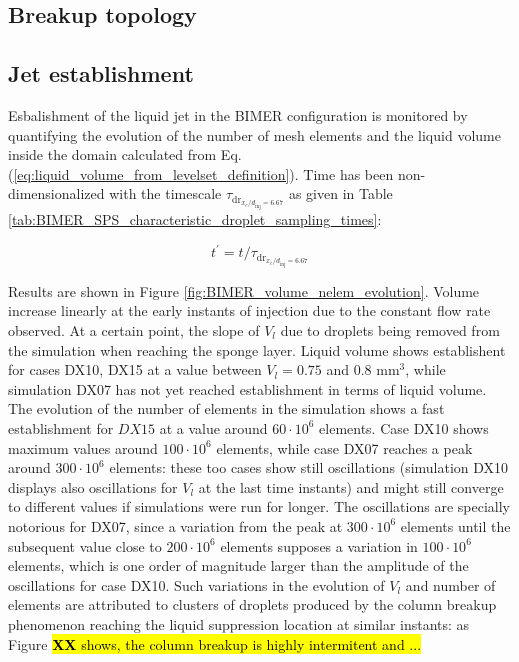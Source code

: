 \clearpage

\subsection{Breakup topology}
\label{ch8:subsec_BIMER_breakup_topology}

\subsection{Jet establishment}

Esbalishment of the liquid jet in the BIMER configuration is monitored by quantifying the evolution of the number of mesh elements and the liquid volume inside the domain calculated from Eq. (\ref{eq:liquid_volume_from_levelset_definition}). Time has been non-dimensionalized with the timescale $\tau_{\mathrm{dr}_{x_c/d_\mathrm{inj}=6.67}}$ as given in Table \ref{tab:BIMER_SPS_characteristic_droplet_sampling_times}:


\begin{equation}
\label{eq:t_prime_BIMER_with_tau_drx10}
t^{\prime} = t / \tau_{\mathrm{dr}_{x_c/d_\mathrm{inj}=6.67}}
\end{equation}

Results are shown in Figure \ref{fig:BIMER_volume_nelem_evolution}. Volume increase linearly at the early instants of injection due to the constant flow rate observed. At a certain point, the slope of $V_l$ due to droplets being removed from the simulation when reaching the sponge layer. Liquid volume shows establishent for cases DX10, DX15 at a value between $V_l = 0.75$ and $0.8$ mm$^3$, while simulation DX07 has not yet reached establishment in terms of liquid volume. The evolution of the number of elements in the simulation shows a fast establishment for $DX15$ at a value around $60 \cdot 10^6$ elements. Case DX10 shows maximum values around $100 \cdot 10^6$ elements, while case DX07 reaches a peak around $300 \cdot 10^6$ elements: these too cases show still oscillations (simulation DX10 displays also oscillations for $V_l$ at the last time instants) and might still converge to different values if simulations were run for longer. The oscillations are specially notorious for DX07, since a variation from the peak at $300 \cdot 10^6$ elements until the subsequent value close to $200 \cdot 10^6$ elements supposes a variation in $100 \cdot 10^6$ elements, which is one order of magnitude larger than the amplitude of the oscillations for case DX10. Such variations in the evolution of $V_l$ and number of elements are attributed to  clusters of droplets produced by the column breakup phenomenon reaching the liquid suppression location at similar instants: as Figure \hl{\textbf{XX} shows, the column breakup is highly intermitent and ...}

